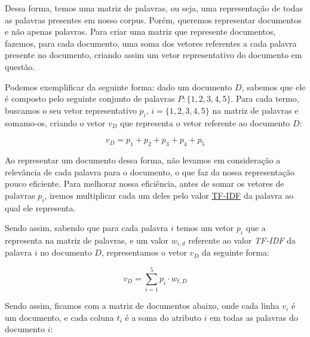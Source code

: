 \documentclass[a4paper,12pt]{article}
\begin{document}
Dessa forma, temos uma matriz de palavras, ou seja, uma representação de todas as palavras presentes em nosso corpus.
Porém, queremos representar documentos e não apenas palavras.
Para criar uma matriz que represente documentos, fazemos, para cada documento, uma soma dos vetores referentes a cada palavra presente
no documento, criando assim um vetor representativo do documento em questão.

Podemos exemplificar da seguinte forma: dado um documento $D$, sabemos que ele é composto pelo seguinte conjunto de palavras
$P:\{1,2,3,4,5\}$. Para cada termo, buscamos o seu vetor representativo $p_{i}$, $i =\{1,2,3,4,5\}$ na matriz de
palavras e somamo-os, criando o vetor $v_{D}$ que representa o vetor referente ao documento $D$:

\begin{equation}
  v_{D} = p_{1}+p_{2}+p_{3}+p_{4}+p_{5}
\end{equation}


Ao representar um documento dessa forma, não levamos em consideração a relevância de cada palavra para o documento, o que
faz da nossa representação pouco eficiente. Para melhorar nossa 
eficiência, antes de somar os vetores de palavras $p_{i}$, iremos multiplicar cada um deles pelo valor \hyperref[sec:nlp]{TF-IDF} da palavra
ao qual ele representa.

Sendo assim, sabendo que para cada palavra $i$ temos um vetor $p_{i}$ que a representa na matriz de palavras, e um valor $w_{i,d}$ referente
ao valor \textit{TF-IDF} da palavra $i$ no documento $D$, representamos o vetor $v_{D}$ da seguinte forma:

\begin{equation}
  v_{D} = \sum_{i=1}^{5} p_{i} \cdot w_{t,D}
\end{equation}


Sendo assim, ficamos com a matriz de documentos abaixo, onde cada linha $v_{i}$ é um documento, e cada coluna $t_{i}$ é a soma do atributo $i$
em todas as palavras do documento $i$:
\end{document}
